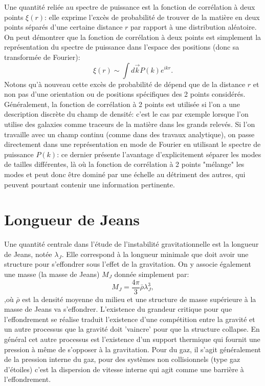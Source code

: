 Une quantité reliée au spectre de puissance est la fonction de corrélation à deux points $\xi (r)$: elle exprime l'excès de probabilité de trouver de la matière en deux points séparés d'une certaine distance $r$ par rapport à une distribution aléatoire. On peut démontrer que la fonction de corrélation à deux points est simplement la représentation du spectre de puissance dans l'espace des positions (donc sa transformée de Fourier):
\begin{equation}
\xi (r)\sim \int d\vec k P(k) e^{i k r}.
\end{equation}
Notons qu'à nouveau cette excès de probabilité de dépend que de la distance $r$ et non pas d'une orientation ou de positions spécifiques des 2 points considérés. Généralement, la fonction de corrélation à 2 points est utilisée si l'on a une description discrète du champ de densité: c'est le cas par exemple lorsque l'on utilise des galaxies comme traceurs de la matière dans les grands relevés. Si l'on travaille avec un champ continu (comme dans des travaux analytique), on passe directement dans une représentation en mode de Fourier en utilisant le spectre de puissance $P(k)$: ce dernier présente l'avantage d'explicitement séparer les modes de tailles différentes, là où la fonction de corrélation à 2 points "mélange" les modes et peut donc être dominé par une échelle au détriment des autres, qui peuvent pourtant contenir une information pertinente.

\section{Longueur de Jeans}
Une quantité centrale dans l'étude de l'instabilité gravitationnelle est la longueur de Jeans, notée $\lambda_J$. Elle correspond à la longueur minimale  que doit avoir une structure pour s'effondrer sous l'effet de la gravitation. On y associe également une masse (la masse de Jeans) $M_J$ donnée simplement par:
\begin{equation}
M_J=\frac{4\pi}{3}\bar\rho\lambda_J^3,
\end{equation}
,où $\bar \rho$ est la densité moyenne du milieu et une structure de masse supérieure à la masse de Jeans va s'effondrer. L'existence du grandeur critique pour que l'effondrement se réalise traduit l'existence d'une compétition entre la gravité et un autre processus que la gravité doit 'vaincre' pour que la structure collapse. En général cet autre processus est l'existence d'un support thermique qui fournit une pression à même de s'opposer à la gravitation. Pour du gaz, il s'agit généralement de la pression interne du gaz, pour des systèmes non collisionnels (type gaz d'étoiles) c'est la dispersion de vitesse interne qui agit comme une barrière à l'effondrement.

